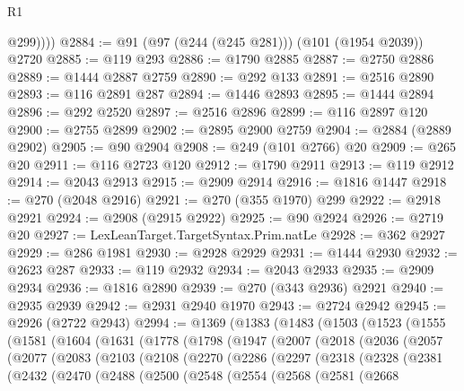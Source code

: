 \begin{lexlean}{R1}
\begin{coremodule}
            @299))))
@2884 := @91 (@97 (@244 (@245 @281))) (@101 (@1954 @2039)) @2720
@2885 := @119 @293
@2886 := @1790 @2885
@2887 := @2750 @2886
@2889 := @1444 @2887 @2759
@2890 := @292 @133
@2891 := @2516 @2890
@2893 := @116 @2891 @287
@2894 := @1446 @2893
@2895 := @1444 @2894
@2896 := @292 @2520
@2897 := @2516 @2896
@2899 := @116 @2897 @120
@2900 := @2755 @2899
@2902 := @2895 @2900 @2759
@2904 := @2884 (@2889 @2902)
@2905 := @90 @2904
@2908 := @249 (@101 @2766) @20
@2909 := @265 @20
@2911 := @116 @2723 @120
@2912 := @1790 @2911
@2913 := @119 @2912
@2914 := @2043 @2913
@2915 := @2909 @2914
@2916 := @1816 @1447
@2918 := @270 (@2048 @2916)
@2921 := @270 (@355 @1970) @299
@2922 := @2918 @2921
@2924 := @2908 (@2915 @2922)
@2925 := @90 @2924
@2926 := @2719 @20
@2927 := LexLeanTarget.TargetSyntax.Prim.natLe
@2928 := @362 @2927
@2929 := @286 @1981
@2930 := @2928 @2929
@2931 := @1444 @2930
@2932 := @2623 @287
@2933 := @119 @2932
@2934 := @2043 @2933
@2935 := @2909 @2934
@2936 := @1816 @2890
@2939 := @270 (@343 @2936) @2921
@2940 := @2935 @2939
@2942 := @2931 @2940 @1970
@2943 := @2724 @2942
@2945 := @2926 (@2722 @2943)
@2994 := @1369
    (@1383
      (@1483
        (@1503
          (@1523
            (@1555
              (@1581
                (@1604
                  (@1631
                    (@1778
                      (@1798
                        (@1947
                          (@2007
                            (@2018
                              (@2036
                                (@2057
                                  (@2077
                                    (@2083
                                      (@2103
                                        (@2108
                                          (@2270
                                            (@2286
                                              (@2297
                                                (@2318
                                                  (@2328
                                                    (@2381
                                                      (@2432
                                                        (@2470
                                                          (@2488
                                                            (@2500
                                                              (@2548
                                                                (@2554
                                                                  (@2568
                                                                    (@2581
                                                                      (@2668

\end{coremodule}
\end{lexlean}
